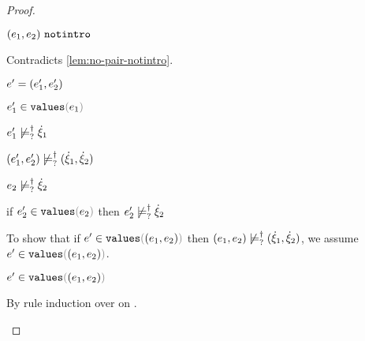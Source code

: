 \begin{proof}
\begin{byCases}
\begin{byCases}
\begin{byCases}
\begin{byCases}
\begin{byCases}
            \begin{pfsteps*}
            \item $(e_1 , e_2) ~\mathtt{notintro}$ 
            \end{pfsteps*}
            Contradicts \autoref{lem:no-pair-notintro}.
            \item[\text{(\ref{rule:IVPair})}]
            \begin{pfsteps*}
            \item $e'=(e_1' , e_2')$ 
            \item $\inValues{e_1'}{e_1}$  
            \item $e_1' \not\models_{?}^{\dag} \dot{\xi}_1$  
            \item $(e_1' , e_2') \not\models_{?}^{\dag} (\dot{\xi}_1 , \dot{\xi}_2)$ 
            \end{pfsteps*} 
          \end{byCases}
          \item[\cnotsatisfyormay{e_2}{\hxi_2}]
          \begin{pfsteps*}
          \item $e_2 \not\models_{?}^{\dag} \dot{\xi}_2$  
          \item if $\inValues{e_2'}{e_2}$ then $e_2' \not\models_{?}^{\dag} \dot{\xi}_2$  
          \end{pfsteps*}
          To show that if $\inValues{e'}{\hpair{e_1}{e_2}}$ then $(e_1 , e_2) \not\models_{?}^{\dag} (\dot{\xi}_1 , \dot{\xi}_2)$, we assume $\inValues{e'}{\hpair{e_1}{e_2}}$.
          \begin{pfsteps*}
          \item $\inValues{e'}{\hpair{e_1}{e_2}}$  
          \end{pfsteps*}
          By rule induction over  on .
          \begin{byCases}
            \item[\text{(\ref{rule:IVVal})}]
            \begin{pfsteps*}

\end{pfsteps*}
\end{byCases}
\end{byCases}
\end{byCases}
\end{byCases}
\end{byCases}
\end{proof}
